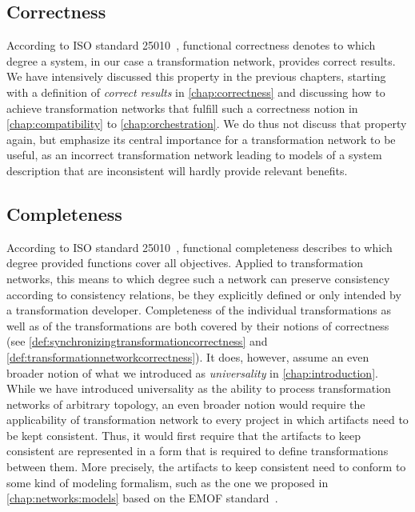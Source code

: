 \subsection{Correctness}

According to ISO standard 25010~\cite{iso25010}, functional correctness denotes to which degree a system, in our case a transformation network, provides correct results.
We have intensively discussed this property in the previous chapters, starting with a definition of \emph{correct results} in \autoref{chap:correctness} and discussing how to achieve transformation networks that fulfill such a correctness notion in \autoref{chap:compatibility} to \autoref{chap:orchestration}.
We do thus not discuss that property again, but emphasize its central importance for a transformation network to be useful, as an incorrect transformation network leading to models of a system description that are inconsistent %
will hardly provide relevant benefits.


\subsection{Completeness}

According to ISO standard 25010~\cite{iso25010}, functional completeness describes to which degree provided functions cover all objectives.
Applied to transformation networks, this means to which degree such a network can preserve consistency according to consistency relations, be they explicitly defined or only intended by a transformation developer.
Completeness of the individual transformations as well as of the transformations are both covered by their notions of correctness (see \autoref{def:synchronizingtransformationcorrectness} and \autoref{def:transformationnetworkcorrectness}).
It does, however, assume an even broader notion of what we introduced as \emph{universality} in \autoref{chap:introduction}.
While we have introduced universality as the ability to process transformation networks of arbitrary topology, an even broader notion would require the applicability of transformation network to every project in which artifacts need to be kept consistent.
Thus, it would first require that the artifacts to keep consistent are represented in a form that is required to define transformations between them.
More precisely, the artifacts to keep consistent need to conform to some kind of modeling formalism, such as the one we proposed in \autoref{chap:networks:models} based on the \gls{EMOF} standard~\cite{mof}.

